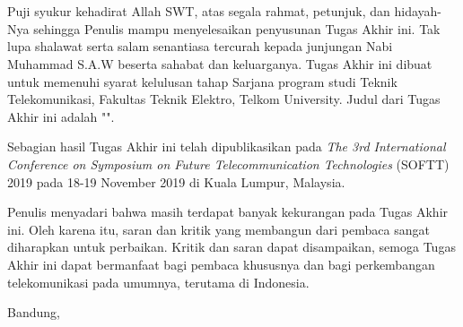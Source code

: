 \chapter*{\kataPengantar}
Puji syukur kehadirat Allah SWT, atas segala rahmat, petunjuk, dan hidayah-Nya sehingga Penulis mampu menyelesaikan penyusunan Tugas Akhir ini. Tak lupa shalawat serta salam senantiasa tercurah kepada junjungan Nabi Muhammad S.A.W beserta sahabat dan keluarganya. Tugas Akhir ini dibuat untuk memenuhi syarat kelulusan tahap Sarjana program studi Teknik Telekomunikasi, Fakultas Teknik Elektro, Telkom University. Judul dari Tugas Akhir ini adalah "\textbf{\Judul}".


Sebagian hasil Tugas Akhir ini telah dipublikasikan pada \textit{The 3rd International Conference on Symposium on Future Telecommunication Technologies}  (SOFTT) 2019 pada 18-19 November 2019 di Kuala Lumpur, Malaysia.


Penulis menyadari bahwa masih terdapat banyak kekurangan pada Tugas Akhir ini. Oleh karena itu, saran dan kritik yang membangun dari pembaca sangat diharapkan untuk perbaikan. Kritik dan saran dapat disampaikan, semoga Tugas Akhir ini dapat bermanfaat bagi pembaca khususnya dan bagi perkembangan telekomunikasi pada umumnya, terutama di Indonesia.
 
\vspace*{0.1cm}
\begin{flushright}
Bandung, \tanggalPengesahan\\[0.1cm]
\vspace*{1cm}
\penulis

\end{flushright}